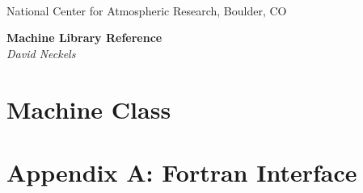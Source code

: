 \documentclass[]{article}
\begin{document}

\begin{titlepage}

\begin{latexonly}
 \\
\noindent National Center for Atmospheric Research, Boulder, CO \\
\vspace{2in}
\end{latexonly}

\begin{center}
{\Large\bf Machine Library Reference} \\
{\it David Neckels}
\end{center}

\end{titlepage}

\tableofcontents

\newpage


%

\section{Machine Class}



%



% 
%

\setcounter{section}{1}

\section*{Appendix A:  Fortran Interface}


\end{document}
